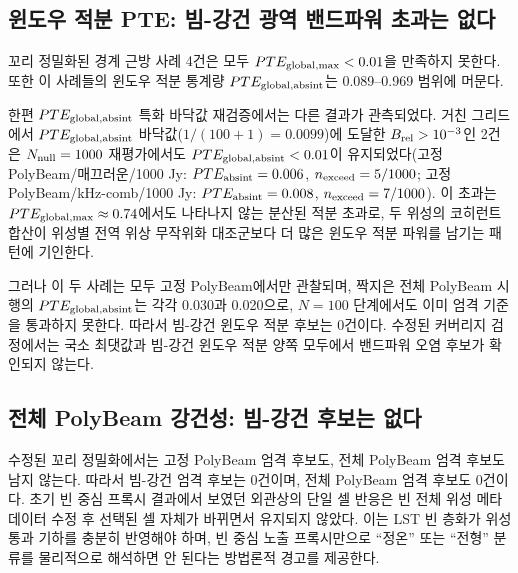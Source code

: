 \documentclass[final,5p,times]{elsarticle}
\newcommand{\NTailRefinedCases}{4}
\newcommand{\NStrictBeamRobust}{0}
\newcommand{\NFullPolyStrict}{0}
\newcommand{\PTEMinHundred}{1/(100+1)=0.0099}
\newcommand{\PTEabsintStrictRange}{0.089--0.969}
\newcommand{\NAbsintFloorAboveGate}{2}
\newcommand{\NAbsintBeamRobust}{0}
\begin{document}
\subsection{윈도우 적분 PTE: 빔-강건 광역 밴드파워 초과는 없다}
\label{sec:results:absint}

꼬리 정밀화된 경계 근방 사례 \NTailRefinedCases{}건은 모두 $PTE_{\rm global,max}<0.01$을 만족하지 못한다.
또한 이 사례들의 윈도우 적분 통계량 $PTE_{\rm global,absint}$는 \PTEabsintStrictRange{} 범위에 머문다.

한편 $PTE_{\rm global,absint}$ 특화 바닥값 재검증에서는 다른 결과가 관측되었다. 거친 그리드에서
$PTE_{\rm global,absint}$ 바닥값($\PTEMinHundred$)에 도달한 $B_{\rm rel}>10^{-3}$인 \NAbsintFloorAboveGate{}건은
$N_{\rm null}=1000$ 재평가에서도 $PTE_{\rm global,absint}<0.01$이 유지되었다(고정 PolyBeam/매끄러운/1000 Jy:
$PTE_{\rm absint}=0.006$, $n_{\rm exceed}=5/1000$; 고정 PolyBeam/kHz-comb/1000 Jy: $PTE_{\rm absint}=0.008$,
$n_{\rm exceed}=7/1000$). 이 초과는 $PTE_{\rm global,max}\approx0.74$에서도 나타나지 않는 분산된 적분
초과로, 두 위성의 코히런트 합산이 위성별 전역 위상 무작위화 대조군보다 더 많은 윈도우 적분 파워를
남기는 패턴에 기인한다.

그러나 이 두 사례는 모두 고정 PolyBeam에서만 관찰되며, 짝지은 전체 PolyBeam 시행의
$PTE_{\rm global,absint}$는 각각 0.030과 0.020으로, $N=100$ 단계에서도 이미 엄격 기준을 통과하지
못한다. 따라서 빔-강건 윈도우 적분 후보는 \NAbsintBeamRobust{}건이다. 수정된 커버리지 검정에서는
국소 최댓값과 빔-강건 윈도우 적분 양쪽 모두에서 밴드파워 오염 후보가 확인되지 않는다.

\subsection{전체 PolyBeam 강건성: 빔-강건 후보는 없다}
\label{sec:results:beam_robustness}

수정된 꼬리 정밀화에서는 고정 PolyBeam 엄격 후보도, 전체 PolyBeam 엄격 후보도 남지 않는다. 따라서
빔-강건 엄격 후보는 \NStrictBeamRobust{}건이며, 전체 PolyBeam 엄격 후보도 \NFullPolyStrict{}건이다.
초기 빈 중심 프록시 결과에서 보였던 외관상의 단일 셀 반응은 빈 전체 위성 메타데이터 수정 후
선택된 셀 자체가 바뀌면서 유지되지 않았다. 이는 LST 빈 층화가 위성 통과 기하를 충분히
반영해야 하며, 빈 중심 노출 프록시만으로 ``정온'' 또는 ``전형'' 분류를 물리적으로 해석하면 안 된다는
방법론적 경고를 제공한다.
\end{document}
